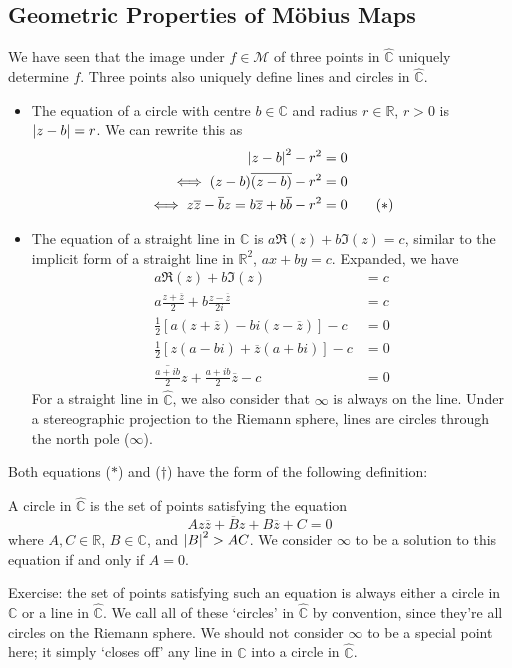 \documentclass{article}
\begin{document}
	\subsection{Geometric Properties of M\"obius Maps}
	We have seen that the image under $f \in \mathcal M$ of three points in $\hat{\mathbb C}$ uniquely determine $f$. Three points also uniquely define lines and circles in $\hat{\mathbb C}$.
	\begin{itemize}
		\item The equation of a circle with centre $b \in \mathbb C$ and radius $r \in \mathbb R$, $r > 0$ is $\abs{z-b} = r$. We can rewrite this as
		\begin{align*}
			\abs{z-b}^2 - r^2 &= 0 \\
			\iff (z-b)\overline{(z-b)} - r^2 &= 0 \\
			\iff z\overline{z} - \overline{b}z = b\overline{z} + b\overline{b} - r^2 &= 0 \tag{$\ast$}
		\end{align*}
		\item The equation of a straight line in $\mathbb C$ is $a \Re(z) + b \Im(z) = c$, similar to the implicit form of a straight line in $\mathbb R^2$, $ax+by=c$. Expanded, we have
		\begin{align*}
			a \Re(z) + b \Im(z) &= c \\
			a \frac{z + \overline z}{2} + b \frac{z - \overline z}{2i} &= c \\
			\frac{1}{2}\left[ a (z + \overline z) - bi (z - \overline z) \right] - c &= 0 \\
			\frac{1}{2}\left[ z(a-bi) + \overline z(a+bi) \right] - c &= 0 \\
			\overline{\frac{a + ib}{2}}z + \frac{a+ib}{2}\overline{z} - c &= 0 \tag{$\dagger$}
		\end{align*}
		For a straight line in $\hat{\mathbb C}$, we also consider that $\infty$ is always on the line. Under a stereographic projection to the Riemann sphere, lines are circles through the north pole ($\infty$).
	\end{itemize}
	Both equations ($\ast$) and ($\dagger$) have the form of the following definition:
	\begin{definition}
		A circle in $\hat{\mathbb C}$ is the set of points satisfying the equation
		\[ Az\overline z + \overline B z + B \overline z + C = 0 \]
		where $A, C \in \mathbb R$, $B \in \mathbb C$, and $\abs{B}^2 > AC$. We consider $\infty$ to be a solution to this equation if and only if $A = 0$.
	\end{definition}
	Exercise: the set of points satisfying such an equation is always either a circle in $\mathbb C$ or a line in $\hat{\mathbb C}$. We call all of these `circles' in $\hat{\mathbb C}$ by convention, since they're all circles on the Riemann sphere. We should not consider $\infty$ to be a special point here; it simply `closes off' any line in $\mathbb C$ into a circle in $\hat{\mathbb C}$.
\end{document}
